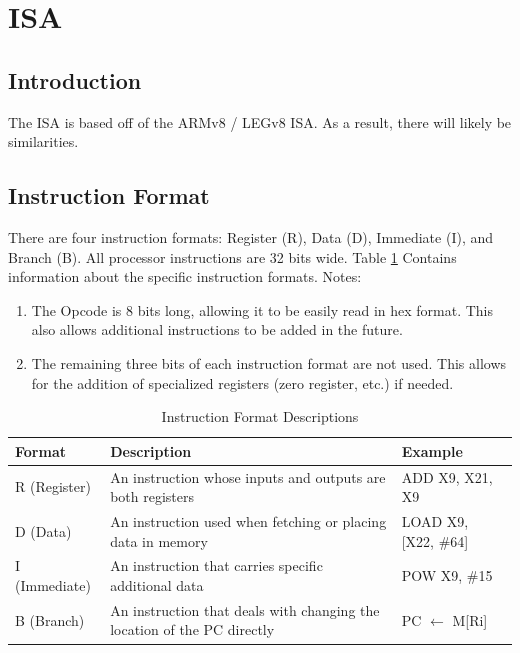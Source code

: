 \documentclass[a4paper,14pt]{article}
\begin{document}
\section{ISA}
\subsection{Introduction}
The ISA is based off of the ARMv8 / LEGv8 ISA. As a result, there will likely be similarities.

\subsection{Instruction Format}
There are four instruction formats: Register (R), Data (D), Immediate (I), and Branch (B). 
All processor instructions are 32 bits wide. Table \ref{table:format_descriptions} Contains information about the specific instruction formats.
\newline
\newline
Notes:
\begin{enumerate}
    \item The Opcode is 8 bits long, allowing it to be easily read in hex format. This also allows additional instructions to be added in the future.
    \item The remaining three bits of each instruction format are not used. This allows for the addition of specialized registers (zero register, etc.) if needed.
\end{enumerate}

\begin{table}
\centering
\caption{Instruction Format Descriptions}
\label{table:format_descriptions}
\begin{tabular}{| l | p{7cm} | l |}
\hline
Format & Description & Example \\ \hline
R (Register) & An instruction whose inputs and outputs are both registers & ADD X9, X21, X9 \\ \hline
D (Data) & An instruction used when fetching or placing data in memory & LOAD X9, {[}X22, \#64{]} \\ \hline
I (Immediate) & An instruction that carries specific additional data & POW X9, \#15 \\ \hline
B (Branch) & An instruction that deals with changing the location of the PC directly & PC $\leftarrow$  M[Ri] \\ \hline
\end{tabular}
\end{table}
\end{document}
